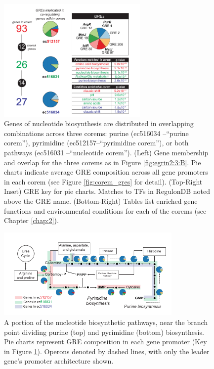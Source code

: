 \begin{figure}[h!]
    \centering
    \includegraphics[width=0.65\textwidth]{figures/egrin2_ecoli_1}
 	\caption[Condition-specific subdivision and coordination of the nucleotide biosynthesis pathway, \eco: functional segregation across corems]{Genes of nucleotide biosynthesis are distributed in overlapping combinations across three \eco corems: purine (ec516034 –“purine corem”), pyrimidine (ec512157–“pyrimidine corem”), or both pathways (ec516031 –“nucleotide corem”). (Left) Gene membership and overlap for the three corems as in Figure \ref{fig:egrin2:3:B}. Pie charts indicate average GRE composition across all gene promoters in each corem (see Figure \ref{fig:corem_gres} for detail). (Top-Right Inset) GRE key for pie charts. Matches to TFs in RegulonDB noted above the GRE name. (Bottom-Right) Tables list enriched gene functions \cite{dennis_david:_2003} and environmental conditions for each of the corems (see Chapter \ref{chap:2}). 
}
    \label{fig:egrin2:4:A}
\end{figure}

\begin{figure}[h!]
    \centering
    \includegraphics[width=0.8\textwidth]{figures/egrin2_ecoli_2}
 	\caption[Corems segment the nucleotide biosynthesis pathway, \eco]{A portion of the nucleotide biosynthetic pathways, near the branch point dividing purine (top) and pyrimidine (bottom) biosynthesis. Pie charts represent GRE composition in each gene promoter (Key in Figure \ref{fig:egrin2:4:A}). Operons denoted by dashed lines, with only the leader gene’s promoter architecture shown.
}
    \label{fig:egrin2:4:B}
\end{figure}

